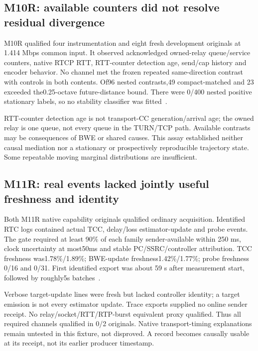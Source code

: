 \documentclass[10pt]{article}
\begin{document}
\subsection{M10R: available counters did not resolve residual divergence}
M10R qualified four instrumentation and eight fresh development originals at
1.414 Mbps common input. It observed acknowledged owned-relay queue/service
counters, native RTCP RTT, RTT-counter detection age, send/cap history and
encoder behavior. No channel met the frozen repeated same-direction contrast
with controls in both contents. Of96 nested contrasts,49 compact-matched and 23
exceeded the0.25-octave future-distance bound. There were 0/400 nested positive
stationary labels, so no stability classifier was fitted~\cite{m10r}.

RTT-counter detection age is not transport-CC generation/arrival age; the owned
relay is one queue, not every queue in the TURN/TCP path. Available contrasts
may be consequences of BWE or shared causes. This assay established neither
causal mediation nor a stationary or prospectively reproducible trajectory
state. Some repeatable moving marginal distributions are insufficient.

\subsection{M11R: real events lacked jointly useful freshness and identity}
Both M11R native capability originals qualified ordinary acquisition. Identified
RTC logs contained actual TCC, delay/loss estimator-update and probe events.
The gate required at least 90\% of each family sender-available within 250 ms,
clock uncertainty at most50ms and stable PC/SSRC/controller attribution. TCC
freshness was1.78\%/1.89\%; BWE-update freshness1.42\%/1.77\%; probe freshness
0/16 and 0/31. First identified export was about 59 s after measurement start,
followed by roughly5s batches~\cite{m11r}.

Verbose target-update lines were fresh but lacked controller identity; a target
emission is not every estimator update. Trace exports supplied no online sender
receipt. No relay/socket/RTT/RTP-burst equivalent proxy qualified. Thus all
required channels qualified in 0/2 originals. Native transport-timing explanations
remain untested in this fixture, not disproved. A record becomes causally usable
at its receipt, not its earlier producer timestamp.
\end{document}
